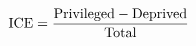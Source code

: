 \documentclass[preview]{standalone}
\begin{document}
\begin{align*}
\special{dvisvgm:raw <g id='unique000'>}\text{ICE} = \frac{\text{Privileged} - \text{Deprived}}{\text{Total}}\special{dvisvgm:raw </g>}
\end{align*}
\end{document}
